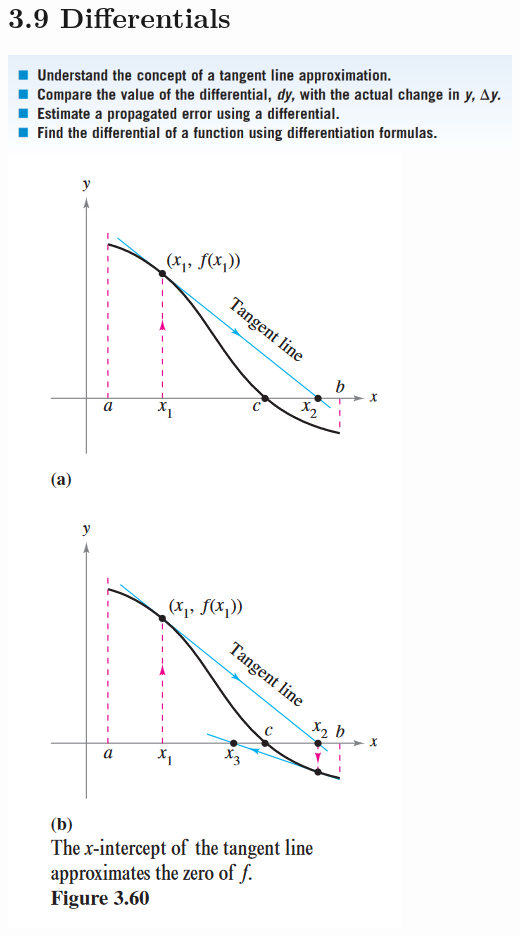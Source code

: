 \documentclass[11pt]{article}
\begin{document}
\section[scale=0.5]{3.9 Differentials}
\includegraphics{LO.png}\\
\includegraphics{3.8.png}
\end{document}
